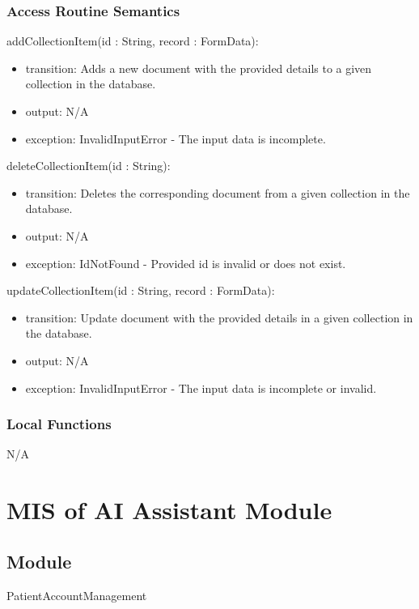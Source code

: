 \documentclass[12pt, titlepage]{article}
\begin{document}
\subsubsection{Access Routine Semantics}

\noindent addCollectionItem(id : String, record : FormData):
\begin{itemize}
\item transition: Adds a new document with the provided details to a given collection in the database.
\item output: N/A
\item exception: InvalidInputError - The input data is incomplete.
\end{itemize}

\noindent deleteCollectionItem(id : String):
\begin{itemize}
\item transition: Deletes the corresponding document from a given collection in the database.
\item output: N/A
\item exception: IdNotFound - Provided id is invalid or does not exist.
\end{itemize}

\noindent updateCollectionItem(id : String, record : FormData):
\begin{itemize}
\item transition: Update document with the provided details in a given collection in the database.
\item output: N/A
\item exception: InvalidInputError - The input data is incomplete or invalid.
\end{itemize}

\subsubsection{Local Functions}

N/A

\newpage

\section{MIS of AI Assistant Module} \label{Module_AIAssist}

\subsection{Module}
PatientAccountManagement
\end{document}
